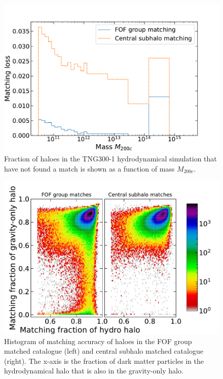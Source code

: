 \begin{figure}
    \includegraphics[width=\linewidth]{plots/hal_match_efficiency_mass.pdf}
    \caption{Fraction of haloes in the TNG300-1 hydrodynamical simulation that have not found a match is shown as a function of mass $M_{200c}$.}
    \label{fig:efficiency-mass-ch:z0main}
\end{figure}

\begin{figure}
\centering
\includegraphics[width=\linewidth]{plots/hal_match_accuracy_hist2d.pdf}
\caption{Histogram of matching accuracy of haloes in the FOF group matched catalogue (left) and central subhalo matched catalogue (right). The x-axis is the fraction of dark matter particles in the hydrodynamical halo that is also in the gravity-only halo.}
\label{fig:accuracy-hist2d-ch:z0main}
\end{figure}

